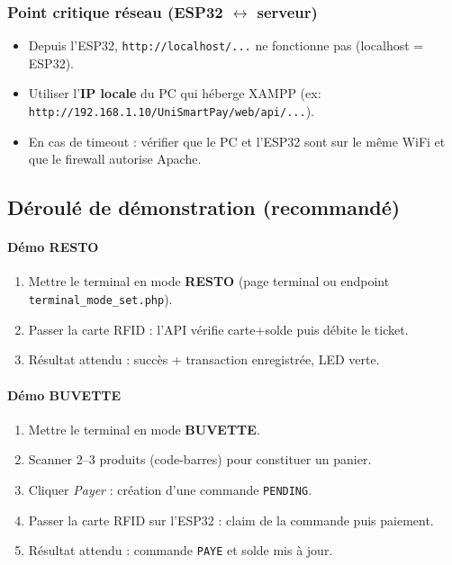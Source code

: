 \documentclass[11pt,a4paper]{article}
\begin{document}
\subsubsection*{Point critique réseau (ESP32 \texorpdfstring{$\leftrightarrow$}{<->} serveur)}
\begin{itemize}
  \item Depuis l’ESP32, \texttt{http://localhost/...} ne fonctionne pas (localhost = ESP32).
  \item Utiliser l’\textbf{IP locale} du PC qui héberge XAMPP (ex: \texttt{http://192.168.1.10/UniSmartPay/web/api/...}).
  \item En cas de timeout : vérifier que le PC et l’ESP32 sont sur le même WiFi et que le firewall autorise Apache.
\end{itemize}

\subsection{Déroulé de démonstration (recommandé)}
\paragraph{Démo RESTO}
\begin{enumerate}
  \item Mettre le terminal en mode \textbf{RESTO} (page terminal ou endpoint \texttt{terminal\_mode\_set.php}).
  \item Passer la carte RFID : l’API vérifie carte+solde puis débite le ticket.
  \item Résultat attendu : succès + transaction enregistrée, LED verte.
\end{enumerate}

\paragraph{Démo BUVETTE}
\begin{enumerate}
  \item Mettre le terminal en mode \textbf{BUVETTE}.
  \item Scanner 2--3 produits (code-barres) pour constituer un panier.
  \item Cliquer \textit{Payer} : création d’une commande \texttt{PENDING}.
  \item Passer la carte RFID sur l’ESP32 : claim de la commande puis paiement.
  \item Résultat attendu : commande \texttt{PAYE} et solde mis à jour.
\end{enumerate}
\end{document}
